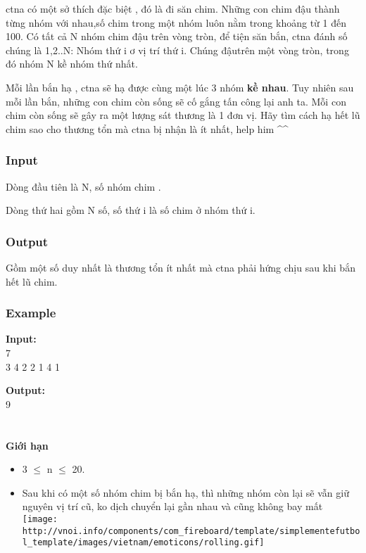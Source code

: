 

ctna có một sở thích đặc biệt , đó là đi săn chim. Những con chim đậu thành từng nhóm với nhau,số chim trong một nhóm luôn nằm trong khoảng từ 1 đến 100. Có tất cả N nhóm chim đậu trên vòng tròn, để tiện săn bắn, ctna đánh số chúng là 1,2..N: Nhóm thứ i ơ vị trí thứ i. Chúng đậutrên một vòng tròn, trong đó nhóm N kề nhóm thứ nhất.

Mỗi lần bắn hạ , ctna sẽ hạ được cùng một lúc 3 nhóm \textbf{ kề nhau}. Tuy nhiên sau mỗi lần bắn, những con chim còn sống sẽ cố gắng tấn công lại anh ta. Mỗi con chim còn sống sẽ gây ra một lượng sát thương là 1 đơn vị. Hãy tìm cách hạ hết lũ chim sao cho thương tổn mà ctna bị nhận là ít nhất, help him \textasciicircum\textasciicircum

\subsubsection{Input}

Dòng đầu tiên là N, số nhóm chim .

Dòng thứ hai gồm N số, số thứ i là số chim ở nhóm thứ i.

\subsubsection{Output}

Gồm một số duy nhất là thương tổn ít nhất mà ctna phải hứng chịu sau khi bắn hết lũ chim.

\subsubsection{Example}

\textbf{Input:}
\\7
\\3 4 2 2 1 4 1

\textbf{Output:}
\\9
\\
\\
\\\textbf{Giới hạn}
\begin{itemize}
	\item 3  $\le$  n  $\le$  20.
	\item Sau khi có một số nhóm chim bị bắn hạ, thì những nhóm còn lại sẽ vẫn giữ nguyên vị trí cũ, ko dịch chuyển lại gần nhau và cũng không bay mất 
\texttt{[image: http://vnoi.info/components/com\_fireboard/template/simplementefutbol\_template/images/vietnam/emoticons/rolling.gif]}
\end{itemize}

